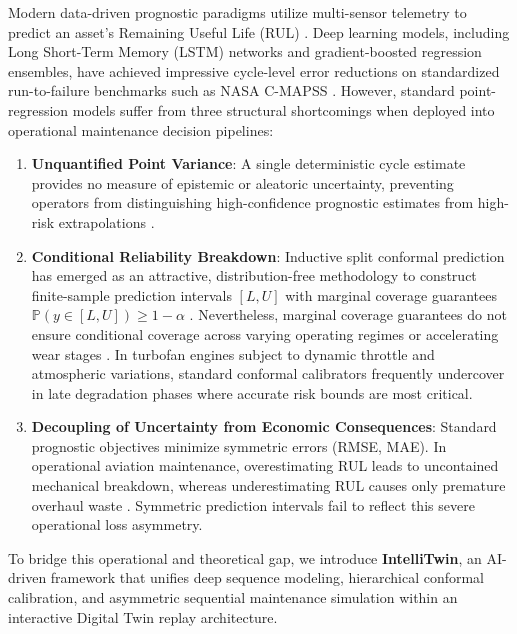 \documentclass[conference,a4paper]{IEEEtran}
\begin{document}
Modern data-driven prognostic paradigms utilize multi-sensor telemetry to predict an asset's Remaining Useful Life (RUL) \cite{wu2026research}. Deep learning models, including Long Short-Term Memory (LSTM) networks and gradient-boosted regression ensembles, have achieved impressive cycle-level error reductions on standardized run-to-failure benchmarks such as NASA C-MAPSS \cite{saxena2008damage, diao2026turbofan}. However, standard point-regression models suffer from three structural shortcomings when deployed into operational maintenance decision pipelines:
\begin{enumerate}
    \item \textbf{Unquantified Point Variance}: A single deterministic cycle estimate provides no measure of epistemic or aleatoric uncertainty, preventing operators from distinguishing high-confidence prognostic estimates from high-risk extrapolations \cite{chen2022data, walia2026uncertainty}.
    \item \textbf{Conditional Reliability Breakdown}: Inductive split conformal prediction has emerged as an attractive, distribution-free methodology to construct finite-sample prediction intervals $[L, U]$ with marginal coverage guarantees $\mathbb{P}(y \in [L, U]) \ge 1 - \alpha$ \cite{javanmardi2023conformal, diao2026turbofan}. Nevertheless, marginal coverage guarantees do not ensure conditional coverage across varying operating regimes or accelerating wear stages \cite{yang2026empirical, yan2026audit}. In turbofan engines subject to dynamic throttle and atmospheric variations, standard conformal calibrators frequently undercover in late degradation phases where accurate risk bounds are most critical.
    \item \textbf{Decoupling of Uncertainty from Economic Consequences}: Standard prognostic objectives minimize symmetric errors (RMSE, MAE). In operational aviation maintenance, overestimating RUL leads to uncontained mechanical breakdown, whereas underestimating RUL causes only premature overhaul waste \cite{zhu2025predictive, robinson2026riskaware}. Symmetric prediction intervals fail to reflect this severe operational loss asymmetry.
\end{enumerate}

To bridge this operational and theoretical gap, we introduce \textbf{IntelliTwin}, an AI-driven framework that unifies deep sequence modeling, hierarchical conformal calibration, and asymmetric sequential maintenance simulation within an interactive Digital Twin replay architecture. 
\end{document}
